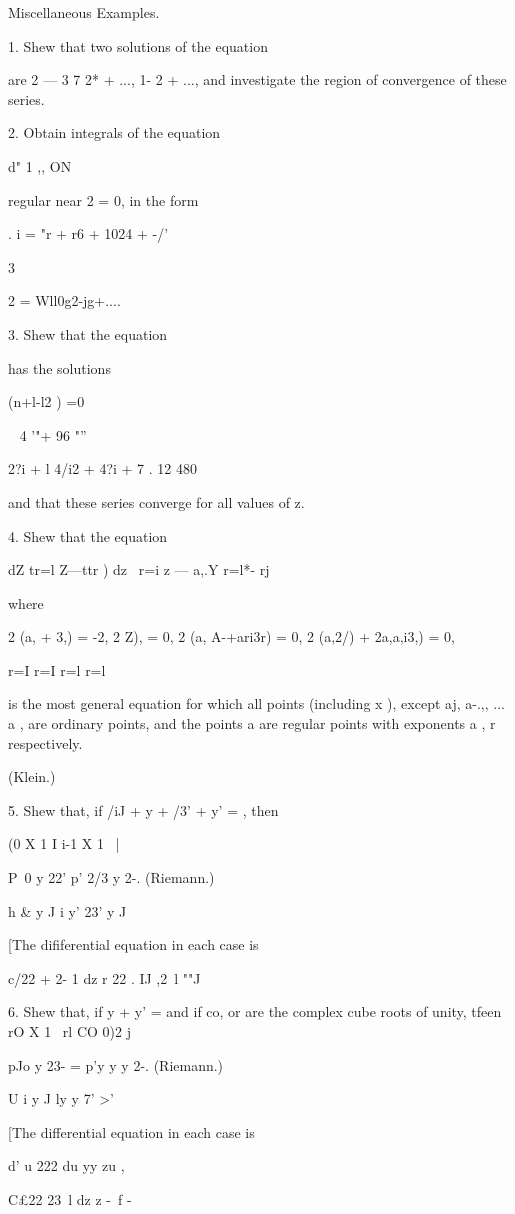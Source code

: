 Miscellaneous Examples.

1. Shew that two solutions of the equation

are 2 — 3 7 2* + ..., 1- 2 + ..., and investigate the region of
convergence of these series.

2. Obtain integrals of the equation

d" 1 ,, ON

regular near 2 = 0, in the form

. i = "r + r6 + 1024 + -/'

3

 2 = Wll0g2-jg+....

3. Shew that the equation

has the solutions

(n+l-l2 ) =0

 ~ 4 '"+ 96 "''

2?i + l 4/i2 + 4?i + 7 . 12 480

and that these series converge for all values of z.

4. Shew that the equation

dZ tr=l Z—ttr ) dz \ r=i z — a,.Y r=l*- rj

where

2 (a, + 3,) = -2, 2 Z), = 0, 2 (a, A-+ari3r) = 0, 2 (a,2/) + 2a,a,i3,)
= 0,

r=I r=I r=l r=l

is the most general equation for which all points (including x ),
except aj, a-.,, ... a , are ordinary points, and the points a are
regular points with exponents a , r respectively.

(Klein.)

5. Shew that, if /iJ + y + /3' + y' = , then

(0 X 1 I i-1 X 1 ~|

P\ 0 y 22' p' 2/3 y 2-. (Riemann.)

h \& y J i y' 23' y J

[The dififerential equation in each case is

c/22 + 2- 1 dz r 22 . IJ ,2\ l ""J

6. Shew that, if y + y' = and if co, or are the complex cube roots of
unity, tfeen rO X 1 \ rl CO 0)2 j

pJo y 23- = p'y y y 2-. (Riemann.)

U i y J ly y 7' >'

[The differential equation in each case is

d' u 222 du yy zu ,

C£22 23\ l dz z -\ f -

